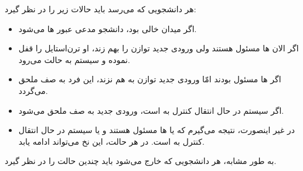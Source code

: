 \documentclass{book}
\begin{document}
    هر دانشجویی که می‌رسد باید حالات زیر را در نظر گیرد: 

\begin{itemize}

\item %
    اگر میدان خالی بود، دانشجو مدعی عبور ها می‌شود. 

\item %
    اگر  الان ها مسئول هستند ولی ورودی جدید توازن را بهم زند، او ترن‌استایل  را قفل نموده و سیستم 
    به حالت  می‌رود. 

\item %
    اگر ها مسئول بودند امّا ورودی جدید توازن به هم نزند، این فرد به صف ملحق می‌گردد. 

\item %
    اگر سیستم در حال انتقال کنترل به   است، ورودی جدید به صف ملحق می‌شود. 

\item %
    در غیر اینصورت،  نتیجه می‌گیرم که یا  ها مسئول هستند و یا سیستم در حال انتقال کنترل به   است. 
    در هر حالت، این نخ می‌تواند ادامه یابد. 
\end{itemize}  

    به طور مشابه، هر دانشجویی که خارج می‌شود باید چندین حالت را در نظر گیرد. 
\end{document}
